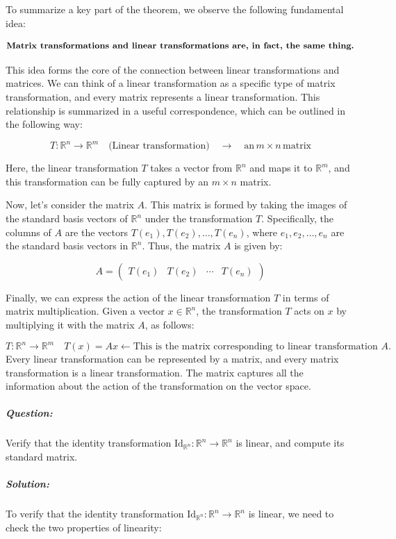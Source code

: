 \documentclass[a4paper,12pt]{article}
\begin{document}
To summarize a key part of the theorem, we observe the following fundamental idea:

\[
\textbf{\text{Matrix transformations and linear transformations are, in fact, the same thing.}}
\]

This idea forms the core of the connection between linear transformations and matrices. We can think of a linear transformation as a specific type of matrix transformation, and every matrix represents a linear transformation. This relationship is summarized in a useful correspondence, which can be outlined in the following way:

\[
T: \mathbb{R}^n \to \mathbb{R}^m \quad \text{(Linear transformation)} \quad \longrightarrow \quad \text{an} \, m \times n \, \text{matrix}
\]

Here, the linear transformation \( T \) takes a vector from \( \mathbb{R}^n \) and maps it to \( \mathbb{R}^m \), and this transformation can be fully captured by an \( m \times n \) matrix.

Now, let’s consider the matrix \( A \). This matrix is formed by taking the images of the standard basis vectors of \( \mathbb{R}^n \) under the transformation \( T \). Specifically, the columns of \( A \) are the vectors \( T(e_1), T(e_2), \dots, T(e_n) \), where \( e_1, e_2, \dots, e_n \) are the standard basis vectors in \( \mathbb{R}^n \). Thus, the matrix \( A \) is given by:

\[
A = \begin{pmatrix} T(e_1) & T(e_2) & \cdots & T(e_n) \end{pmatrix}
\]

Finally, we can express the action of the linear transformation \( T \) in terms of matrix multiplication. Given a vector \( x \in \mathbb{R}^n \), the transformation \( T \) acts on \( x \) by multiplying it with the matrix \( A \), as follows:

\[
T: \mathbb{R}^n \to \mathbb{R}^m \quad T(x) = Ax \longleftarrow \text{This is the matrix corresponding to linear transformation } A.
\]
 Every linear transformation can be represented by a matrix, and every matrix transformation is a linear transformation. The matrix captures all the information about the action of the transformation on the vector space.

\subparagraph{Question:}
Verify that the identity transformation \( \text{Id}_{\mathbb{R}^n}: \mathbb{R}^n \to \mathbb{R}^n \) is linear, and compute its standard matrix.
\subparagraph{Solution:} To verify that the identity transformation \( \text{Id}_{\mathbb{R}^n} : \mathbb{R}^n \to \mathbb{R}^n \) is linear, we need to check the two properties of linearity:
\end{document}
